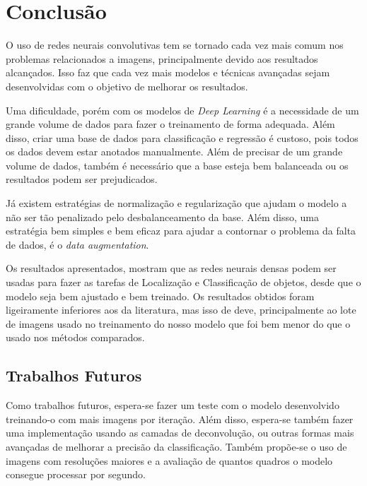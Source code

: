 \chapter{Conclusão}
\label{cap:6}

O uso de redes neurais convolutivas tem se tornado cada vez mais comum nos problemas relacionados a imagens, principalmente devido aos resultados alcançados. Isso faz que cada vez mais modelos e técnicas avançadas sejam desenvolvidas com o objetivo de melhorar os resultados.

Uma dificuldade, porém com os modelos de \textit{Deep Learning} é a necessidade de um grande volume de dados para fazer o treinamento de forma adequada. Além disso, criar uma base de dados para classificação e regressão é custoso, pois todos os dados devem estar anotados manualmente. Além de precisar de um grande volume de dados, também é necessário que a base esteja bem balanceada ou os resultados podem ser prejudicados.

Já existem estratégias de normalização e regularização que ajudam o modelo a não ser tão penalizado pelo desbalanceamento da base. Além disso, uma estratégia bem simples e bem eficaz para ajudar a contornar o problema da falta de dados, é o \textit{data augmentation}.

Os resultados apresentados, mostram que as redes neurais densas podem ser usadas para fazer as tarefas de Localização e Classificação de objetos, desde que o modelo seja bem ajustado e bem treinado. Os resultados obtidos foram ligeiramente inferiores aos da literatura, mas isso de deve, principalmente ao lote de imagens usado no treinamento do nosso modelo que foi bem menor do que o usado nos métodos comparados. 

\section{Trabalhos Futuros}

Como trabalhos futuros, espera-se fazer um teste com o modelo desenvolvido treinando-o com mais imagens por iteração. Além disso, espera-se também fazer uma implementação usando as camadas de deconvolução, ou outras formas mais avançadas de melhorar a precisão da classificação. Também propõe-se o uso de imagens com resoluções maiores e a avaliação de quantos quadros o modelo consegue processar por segundo.